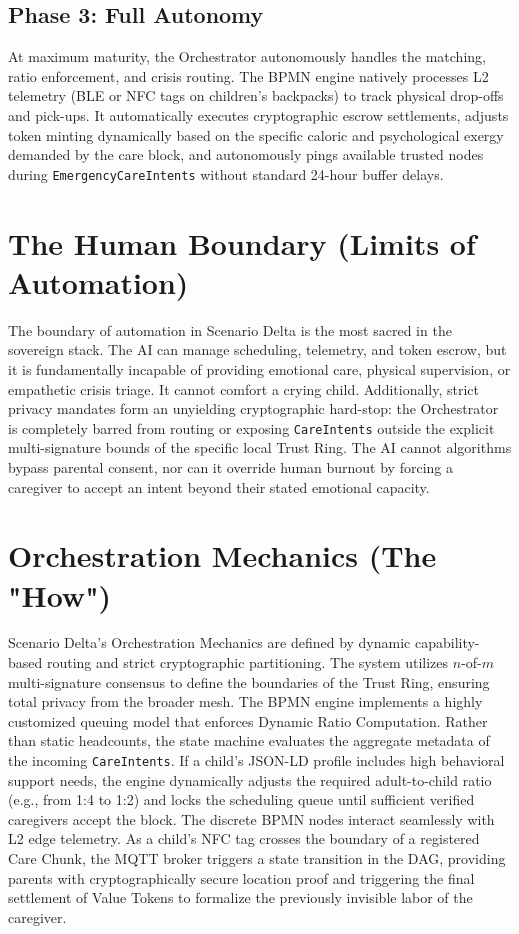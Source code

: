 \subsection{Phase 3: Full Autonomy}
At maximum maturity, the Orchestrator autonomously handles the matching, ratio enforcement, and crisis routing. The BPMN engine natively processes L2 telemetry (BLE or NFC tags on children's backpacks) to track physical drop-offs and pick-ups. It automatically executes cryptographic escrow settlements, adjusts token minting dynamically based on the specific caloric and psychological exergy demanded by the care block, and autonomously pings available trusted nodes during \texttt{EmergencyCareIntents} without standard 24-hour buffer delays.

\section{The Human Boundary (Limits of Automation)}
The boundary of automation in Scenario Delta is the most sacred in the sovereign stack. The AI can manage scheduling, telemetry, and token escrow, but it is fundamentally incapable of providing emotional care, physical supervision, or empathetic crisis triage. It cannot comfort a crying child. Additionally, strict privacy mandates form an unyielding cryptographic hard-stop: the Orchestrator is completely barred from routing or exposing \texttt{CareIntents} outside the explicit multi-signature bounds of the specific local Trust Ring. The AI cannot algorithms bypass parental consent, nor can it override human burnout by forcing a caregiver to accept an intent beyond their stated emotional capacity.

\section{Orchestration Mechanics (The "How")}
Scenario Delta's Orchestration Mechanics are defined by dynamic capability-based routing and strict cryptographic partitioning. The system utilizes $n$-of-$m$ multi-signature consensus to define the boundaries of the Trust Ring, ensuring total privacy from the broader mesh. 
The BPMN engine implements a highly customized queuing model that enforces Dynamic Ratio Computation. Rather than static headcounts, the state machine evaluates the aggregate metadata of the incoming \texttt{CareIntents}. If a child's JSON-LD profile includes high behavioral support needs, the engine dynamically adjusts the required adult-to-child ratio (e.g., from 1:4 to 1:2) and locks the scheduling queue until sufficient verified caregivers accept the block. 
The discrete BPMN nodes interact seamlessly with L2 edge telemetry. As a child's NFC tag crosses the boundary of a registered Care Chunk, the MQTT broker triggers a state transition in the DAG, providing parents with cryptographically secure location proof and triggering the final settlement of Value Tokens to formalize the previously invisible labor of the caregiver.
